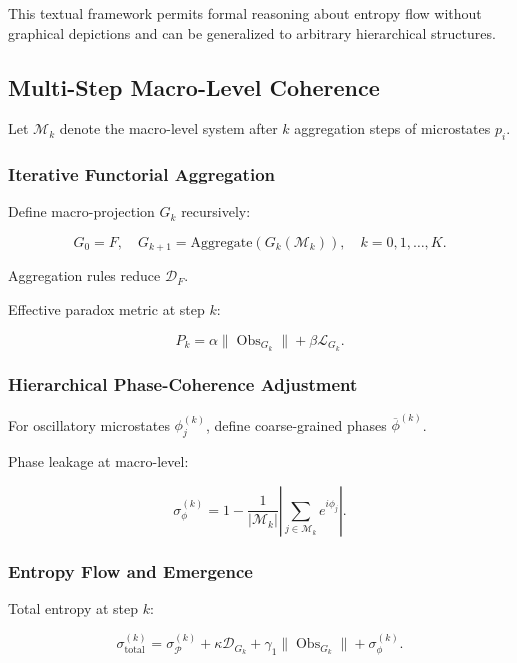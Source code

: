 \documentclass[12pt]{article}
\theoremstyle{plain}
\begin{document}
This textual framework permits formal reasoning about entropy flow without graphical depictions and can be generalized to arbitrary hierarchical structures.

\subsection{Multi-Step Macro-Level Coherence}

Let \(\mathcal{M}_k\) denote the macro-level system after \(k\) aggregation steps of microstates \(p_i\).

\subsubsection{Iterative Functorial Aggregation}

Define macro-projection \(G_k\) recursively:

\begin{equation}
G_0 = F, \quad G_{k+1} = \text{Aggregate}(G_k(\mathcal{M}_k)), \quad k = 0,1,\dots,K.
\end{equation}

Aggregation rules reduce \(\mathcal{D}_F\).

Effective paradox metric at step \(k\):

\begin{equation}
P_k = \alpha \|\operatorname{Obs}_{G_k}\| + \beta \mathcal{L}_{G_k}.
\end{equation}

\subsubsection{Hierarchical Phase-Coherence Adjustment}

For oscillatory microstates \(\phi_j^{(k)}\), define coarse-grained phases \(\overline{\phi}^{(k)}\).

Phase leakage at macro-level:

\begin{equation}
\sigma_\phi^{(k)} = 1 - \frac{1}{|\mathcal{M}_k|} \left|\sum_{j \in \mathcal{M}_k} e^{i\phi_j}\right|.
\end{equation}

\subsubsection{Entropy Flow and Emergence}

Total entropy at step \(k\):

\begin{equation}
\sigma_{\mathrm{total}}^{(k)} = \sigma_\mathcal{P}^{(k)} + \kappa \mathcal{D}_{G_k} + \gamma_1 \|\operatorname{Obs}_{G_k}\| + \sigma_\phi^{(k)}.
\end{equation}
\end{document}

